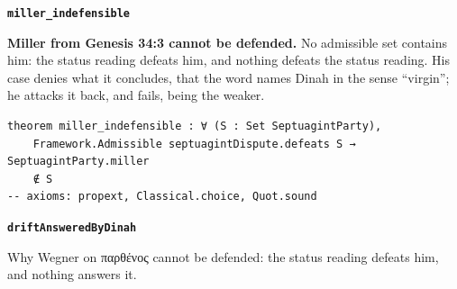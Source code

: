 \documentclass[11pt]{article}
\begin{document}
\par\medskip\noindent\textbf{\texttt{miller\_\allowbreak{}indefensible}}\par\nobreak\noindent
\textbf{Miller from Genesis 34:3 cannot be defended.} No admissible set contains him: the status reading defeats him, and nothing defeats the status reading. His case denies what it concludes, that the word names Dinah in the sense “virgin”; he attacks it back, and fails, being the weaker.

{\small\begin{verbatim}
theorem miller_indefensible : ∀ (S : Set SeptuagintParty),
    Framework.Admissible septuagintDispute.defeats S → SeptuagintParty.miller
    ∉ S
-- axioms: propext, Classical.choice, Quot.sound
\end{verbatim}}
\par\medskip\noindent\textbf{\texttt{drift\allowbreak{}Answered\allowbreak{}By\allowbreak{}Dinah}}\par\nobreak\noindent
Why Wegner on παρθένος cannot be defended: the status reading defeats him, and nothing answers it.
\end{document}
